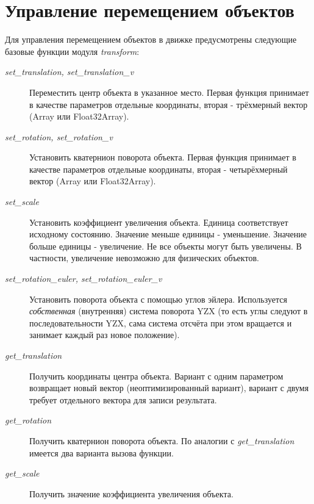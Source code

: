 \documentclass[a4paper,12pt,oneside]{sphinxmanual}
\begin{document}
\section{Управление перемещением объектов}
\label{developers:id16}
Для управления перемещением объектов в движке предусмотрены следующие базовые функции модуля \emph{transform}:
\begin{description}
\item[{\emph{set\_translation, set\_translation\_v}}] \leavevmode
Переместить центр объекта в указанное место. Первая функция принимает в качестве параметров отдельные координаты, вторая - трёхмерный вектор (Array или Float32Array).

\item[{\emph{set\_rotation, set\_rotation\_v}}] \leavevmode
Установить кватернион поворота объекта. Первая функция принимает в качестве параметров отдельные координаты, вторая - четырёхмерный вектор (Array или Float32Array).

\item[{\emph{set\_scale}}] \leavevmode
Установить коэффициент увеличения объекта. Единица соответствует исходному состоянию. Значение меньше единицы - уменьшение. Значение больше единицы - увеличение. Не все объекты могут быть увеличены. В частности, увеличение невозможно для физических объектов.

\item[{\emph{set\_rotation\_euler, set\_rotation\_euler\_v}}] \leavevmode
Установить поворота объекта с помощью углов эйлера. Используется
\emph{собственная} (внутренняя) система поворота YZX (то есть углы следуют в
последовательности YZX, сама система отсчёта при этом вращается и занимает
каждый раз новое положение).

\item[{\emph{get\_translation}}] \leavevmode
Получить координаты центра объекта. Вариант с одним параметром возвращает
новый вектор (неоптимизированный вариант), вариант с двумя требует
отдельного вектора для записи результата.

\item[{\emph{get\_rotation}}] \leavevmode
Получить кватернион поворота объекта. По аналогии с \emph{get\_translation} имеется два варианта вызова функции.

\item[{\emph{get\_scale}}] \leavevmode
Получить значение коэффициента увеличения объекта.

\end{description}
\end{document}
